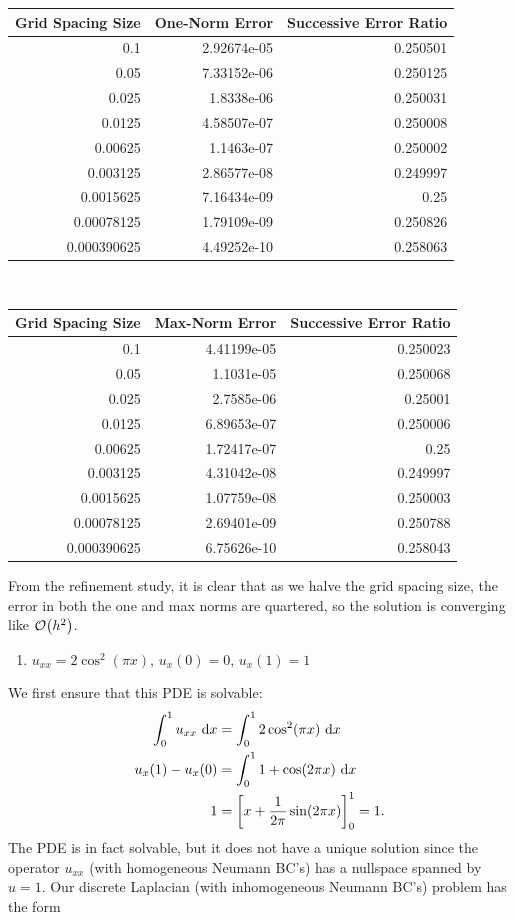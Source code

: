 \documentclass[12pt]{article}
\begin{document}
\begin{center}
\begin{tabular}{rrr}
\hline
Grid Spacing Size &  One-Norm Error & Successive Error Ratio \\
\hline
 0.1         & 2.92674e-05 & 0.250501 \\
 0.05        & 7.33152e-06 & 0.250125 \\
 0.025       & 1.8338e-06  & 0.250031 \\
 0.0125      & 4.58507e-07 & 0.250008 \\
 0.00625     & 1.1463e-07  & 0.250002 \\
 0.003125    & 2.86577e-08 & 0.249997 \\
 0.0015625   & 7.16434e-09 & 0.25     \\
 0.00078125  & 1.79109e-09 & 0.250826 \\
 0.000390625 & 4.49252e-10 & 0.258063 \\
\hline
\end{tabular}\\
\begin{tabular}{rrr}
\hline
Grid Spacing Size &  Max-Norm Error & Successive Error Ratio \\
\hline
 0.1         & 4.41199e-05 & 0.250023 \\
 0.05        & 1.1031e-05  & 0.250068 \\
 0.025       & 2.7585e-06  & 0.25001  \\
 0.0125      & 6.89653e-07 & 0.250006 \\
 0.00625     & 1.72417e-07 & 0.25     \\
 0.003125    & 4.31042e-08 & 0.249997 \\
 0.0015625   & 1.07759e-08 & 0.250003 \\
 0.00078125  & 2.69401e-09 & 0.250788 \\
 0.000390625 & 6.75626e-10 & 0.258043 \\
\hline
\end{tabular}
\end{center}

From the refinement study, it is clear that as we halve the grid spacing size, the error in both the one and max norms are quartered, so the solution is converging like $\order{h^2}$.
\newpage

\begin{enumerate}[ \ \ (b)]
\item $u_{xx} = 2\cos^2(\pi x)$, $u_x(0)=0$, $u_x(1)=1$
\end{enumerate}
We first ensure that this PDE is solvable:
\begin{align*}
\int_0^1 u_{xx} \ \dd x &= \int_0^1 2 \cos^2(\pi x) \ \dd x \\
u_x(1) - u_x(0) &= \int_0^1 1 + \cos(2 \pi x) \ \dd x \\
1 &= \qty[x + \dfrac{1}{2\pi}\sin(2 \pi x)]_0^1 = 1.
\end{align*} 
The PDE is in fact solvable, but it does not have a unique solution since the operator $u_{xx}$ (with homogeneous Neumann BC's) has a nullspace spanned by $u = 1$.  Our discrete Laplacian (with inhomogeneous Neumann BC's) problem has the form
\end{document}
